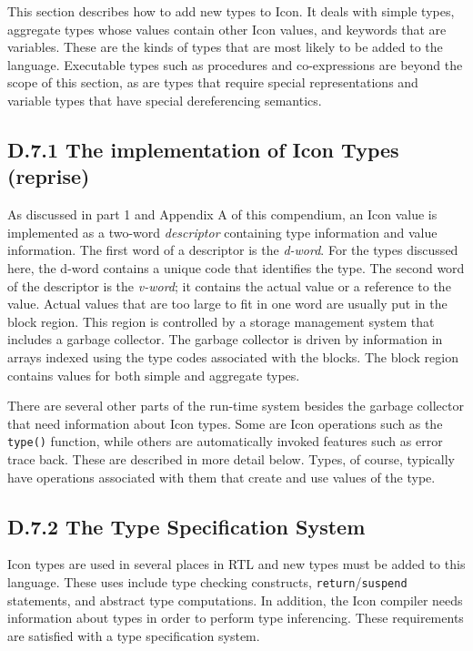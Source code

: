 This section describes how to add new types to Icon. It deals with simple
types, aggregate types whose values contain other Icon values, and keywords
that are variables. These are the kinds of types that are most likely to be
added to the language. Executable types such as procedures and
co-expressions are beyond the scope of this section, as are types that
require special representations and variable types that have special
dereferencing semantics.

\subsection{D.7.1 The implementation of Icon Types (reprise)}

As discussed in part 1 and Appendix A of this compendium, an Icon value is
implemented as a two-word \textit{descriptor} containing type information
and value information. The first word of a descriptor is the {\em d-word}.
For the types discussed here, the d-word contains a unique code that
identifies the type. The second word of the descriptor is the {\em v-word};
it contains the actual value or a reference to the value.  Actual values
that are too large to fit in one word are usually put in the block
region. This region is controlled by a storage management system that
includes a garbage collector. The garbage collector is driven by
information in arrays indexed using the type codes associated with the
blocks. The block region contains values for both simple and aggregate
types.

There are several other parts of the run-time system besides the
garbage collector that need information about Icon types. Some are Icon
operations such as the \texttt{type()} function, while others are
automatically invoked features such as error trace back. These are
described in more detail below. Types, of course, typically have operations
associated with them that create and use values of the type.


\subsection{D.7.2 The Type Specification System}

Icon types are used in several places in RTL and new types must be added to
this language. These uses include type checking constructs,
\texttt{return}/\texttt{suspend} statements, and abstract type computations.
In addition, the Icon compiler needs information about types in order to
perform type inferencing. These requirements are satisfied with a type
specification system.

